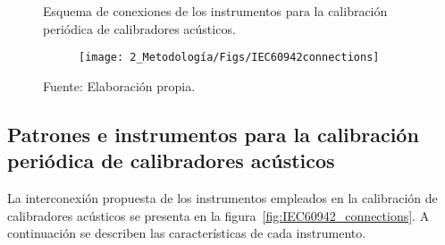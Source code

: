 \begin{figure}[!h]
    \caption{Esquema de conexiones de los instrumentos para la calibración periódica de calibradores acústicos.}
    \label{fig:IEC60942_connections}
    \begin{subfigure}[t]{0.59\textwidth}
        \centering
        \texttt{[image: 2\_Metodología/Figs/IEC60942connections]}
    \end{subfigure}
    \hfill
    \begin{subfigure}[t]{0.4\textwidth}
        \centering
    \end{subfigure}
    \caption*{\footnotesize Fuente: Elaboración propia.}
\end{figure}

\subsection{Patrones e instrumentos para la calibración periódica de calibradores acústicos}

La interconexión propuesta de los instrumentos empleados en la calibración de calibradores acústicos se presenta en la figura~\ref{fig:IEC60942_connections}.
A continuación se describen las características de cada instrumento.

